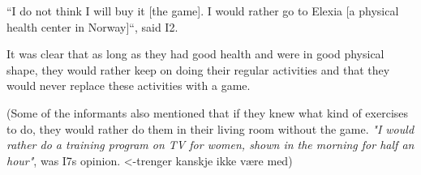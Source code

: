 “I do not think I will buy it [the game]. I would rather go to Elexia [a physical health center in Norway]“, said I2.

It was clear that as long as they had good health and were in good physical shape, they would rather keep on doing their regular activities and that they would never replace these activities with a game. 

(Some of the informants also mentioned that if they knew what kind of exercises to do, they would rather do them in their living room without the game. 
\emph{"I would rather do a training program on TV for women, shown in the morning for half an hour"}, was I7s opinion. <-trenger kanskje ikke være med)


